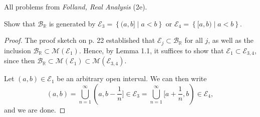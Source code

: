 \documentclass[12pt]{article}
\newenvironment{problem}[2][Problem]{\begin{trivlist}
    \item[\hskip \labelsep {\bfseries #1}\hskip \labelsep {\bfseries #2.}]}{\end{trivlist}}
\theoremstyle{definition}
\begin{document}
All problems from \textit{Folland, Real Analysis} (2e).

\begin{problem}{1.2.2(e)}
	Show that \( \mathcal{B}_{\mathbb{R}} \) is generated by \( \mathcal{E}_3 = \left\{ (a,b] \mid a < b \right\} \) or \( \mathcal{E}_4 = \left\{ [a,b) \mid a < b \right\} \).
\end{problem}
\begin{proof}
	The proof sketch on p. 22 established that \( \mathcal{E}_j \subset \mathcal{B}_{\mathbb{R}} \) for all \( j \), as well as the inclusion \( \mathcal{B}_{\mathbb{R}} \subset \mathcal{M}(\mathcal{E}_{1}) \).
	Hence, by Lemma 1.1, it suffices to show that \( \mathcal{E}_1 \subset \mathcal{E}_{3,4} \), since then \( \mathcal{B}_{\mathbb{R}} \subset \mathcal{M}(\mathcal{E}_1) \subset \mathcal{M}(\mathcal{E}_{3,4}) \).

	Let \( (a,b) \in \mathcal{E}_1 \) be an arbitrary open interval.
	We can then write
	\begin{equation}
		\label{eq:32}
		(a,b) = \bigcup_{n=1}^{\infty} (a, b - \frac{1}{n}] \in \mathcal{E}_3 = \bigcup_{n=1}^{\infty} [a + \frac{1}{n}, b) \in \mathcal{E}_{4},
	\end{equation}
	and we are done.
\end{proof}
\end{document}
